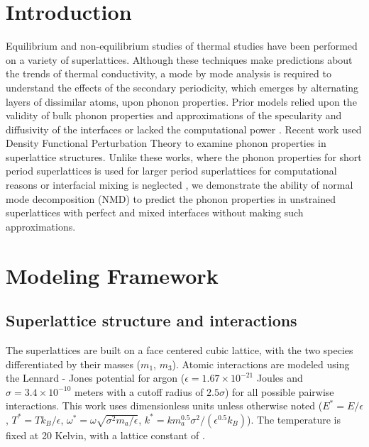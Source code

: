 \documentclass[aps,prb,preprint,preprintnumbers,amsmath,amssymb,floatfix,superscriptaddress]{revtex4}
\begin{document}
\section{Introduction}
Equilibrium \cite {PhysRevB.85.195302} and non-equilibrium \cite {PhysRevB.79.214307,PhysRevB.79.075316,PhysRevB.72.174302} studies of thermal studies have been performed on a variety of superlattices. Although these techniques make predictions about the trends of thermal conductivity, a mode by mode analysis is required to understand the effects of the secondary periodicity, which emerges by alternating layers of dissimilar atoms, upon phonon properties. Prior models relied upon the validity of bulk phonon properties and approximations of the specularity and diffusivity of the interfaces \cite {PhysRevB.57.14958} or lacked the computational power \cite {PhysRevB.70.081310}. Recent work \cite{Luckyanova16112012,doi:10.1021/nl202186y} used Density Functional Perturbation Theory to examine phonon properties in superlattice structures. Unlike these works, where the phonon properties for short period superlattices is used for larger period superlattices for computational reasons \cite{Luckyanova16112012, doi:10.1021/nl202186y} or interfacial mixing is neglected \cite{doi:10.1021/nl202186y}, we demonstrate the ability of normal mode decomposition (NMD) to predict the phonon properties in unstrained superlattices with perfect and mixed interfaces without making such approximations.
\section{Modeling Framework}
\subsection{Superlattice structure and interactions}\label{SEC:sl_struc}
The superlattices are built on a face centered cubic lattice,  with the two species differentiated by their masses ($m_1$, $m_3$). Atomic interactions are modeled using the Lennard - Jones potential for argon ($\epsilon= 1.67\times10^{-21}$ Joules and $\sigma= 3.4\times10^{-10}$ meters with a cutoff radius of $2.5\sigma$) for all possible pairwise interactions. This work uses dimensionless units unless otherwise noted ($E^*=E/\epsilon$, $T^*=Tk_B/\epsilon$, $\omega^*=\omega\sqrt{\sigma^2m_a/\epsilon}$, $k^*=km^{0.5}_a\sigma^2/(\epsilon^{0.5}k_B)$). The temperature is fixed at 20 Kelvin, with a lattice constant of \cite{alan}.
\end{document}
